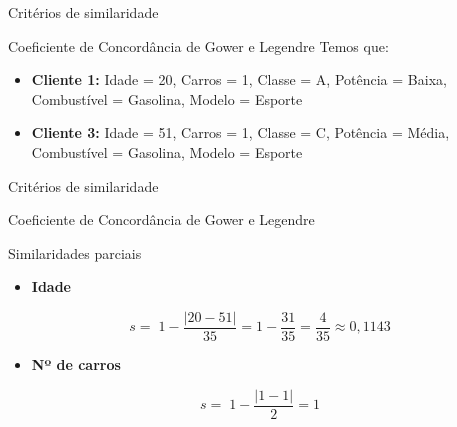 \documentclass[
  ignorenonframetext,
  aspectratio=169,
]{beamer}
\providecommand{\tightlist}{%
  \setlength{\itemsep}{0pt}\setlength{\parskip}{0pt}}
\begin{document}
\begin{frame}{Critérios de similaridade}
\protect{}\label{crituxe9rios-de-similaridade-15}
\begin{block}{Coeficiente de Concordância de Gower e Legendre}
\protect{}\label{coeficiente-de-concorduxe2ncia-de-gower-e-legendre-8}
Temos que:

\begin{itemize}
\item
  \textbf{Cliente 1:} Idade = 20, Carros = 1, Classe = A, Potência =
  Baixa, Combustível = Gasolina, Modelo = Esporte
\item
  \textbf{Cliente 3:} Idade = 51, Carros = 1, Classe = C, Potência =
  Média, Combustível = Gasolina, Modelo = Esporte
\end{itemize}
\end{block}
\end{frame}

\begin{frame}{Critérios de similaridade}
\protect{}\label{crituxe9rios-de-similaridade-16}
\begin{block}{Coeficiente de Concordância de Gower e Legendre}
\protect{}\label{coeficiente-de-concorduxe2ncia-de-gower-e-legendre-9}
\begin{block}{Similaridades parciais}
\protect{}\label{similaridades-parciais}
\begin{itemize}
\tightlist
\item
  \textbf{Idade}
\end{itemize}

\[
s=\;1-\dfrac{|20-51|}{35}=1-\dfrac{31}{35}=\dfrac{4}{35}\approx 0,1143
\]

\begin{itemize}
\tightlist
\item
  \textbf{Nº de carros}
\end{itemize}

\[
s=\;1-\dfrac{|1-1|}{2}=1
\]
\end{block}
\end{block}
\end{frame}
\end{document}
